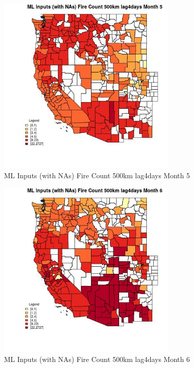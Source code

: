 \begin{figure} 
\centering  
\includegraphics[width=0.77\textwidth]{Code_Outputs/Report_ML_input_PM25_Step4_part_f_de_duplicated_aveswNAs_CountyFire_Count_500km_lag4daysmedianMonth5.jpg} 
\caption{\label{fig:Report_ML_input_PM25_Step4_part_f_de_duplicated_aveswNAsCountyFire_Count_500km_lag4daysmedianMonth5}ML Inputs (with NAs) Fire Count 500km lag4days Month 5} 
\end{figure} 
 

\begin{figure} 
\centering  
\includegraphics[width=0.77\textwidth]{Code_Outputs/Report_ML_input_PM25_Step4_part_f_de_duplicated_aveswNAs_CountyFire_Count_500km_lag4daysmedianMonth6.jpg} 
\caption{\label{fig:Report_ML_input_PM25_Step4_part_f_de_duplicated_aveswNAsCountyFire_Count_500km_lag4daysmedianMonth6}ML Inputs (with NAs) Fire Count 500km lag4days Month 6} 
\end{figure} 
 

